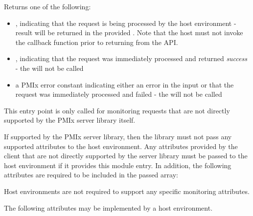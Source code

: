 Returns one of the following:

\begin{itemize}
    \item {}, indicating that the request is being processed by the host environment - result will be returned in the provided . Note that the host must not invoke the callback function prior to returning from the \ac{API}.
    \item {}, indicating that the request was immediately processed and returned \textit{success} - the  will not be called
    \item a PMIx error constant indicating either an error in the input or that the request was immediately processed and failed - the  will not be called
\end{itemize}

This entry point is only called for monitoring requests that are not directly supported by the \ac{PMIx} server library itself.

\reqattrstart
If supported by the \ac{PMIx} server library, then the library must not pass any supported attributes to the host environment. Any attributes provided by the client that are not directly supported by the server library must be passed to the host environment if it provides this module entry. In addition, the following attributes are required to be included in the passed  array:


\divider

Host environments are not required to support any specific monitoring attributes.

\reqattrend

\optattrstart
The following attributes may be implemented by a host environment.



